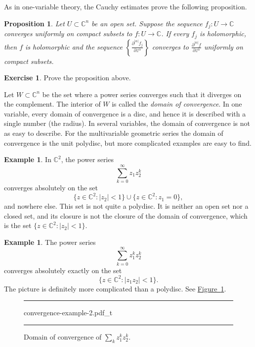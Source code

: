 \documentclass[12pt,openany]{book}
\newcommand{\sabs}[1]{\lvert {#1} \rvert}
\newcommand{\C}{{\mathbb{C}}}
\newcommand{\myindex}[1]{#1\index{#1}}
\theoremstyle{plain}
\newtheorem{prop}[thm]{Proposition}
\theoremstyle{remark}
\theoremstyle{definition}
\newenvironment{exbox}{%
    \def\FrameCommand{\vrule width 1pt \relax\hspace{10pt}}%
    \MakeFramed{\advance\hsize-\width\FrameRestore}%
}{%
    \endMakeFramed
}
\newenvironment{myfig}{%
\begin{figure}[h!t]
\noindent\rule{\textwidth}{0.5pt}\vspace{12pt}\par\centering}%
{\par\noindent\rule{\textwidth}{0.5pt}
\end{figure}}
\theoremstyle{exercise}
\newtheorem{exercise}{Exercise}[section]
\theoremstyle{example}
\newtheorem{example}[thm]{Example}
\newcommand{\figureref}[1]{\hyperref[#1]{Figure~\ref*{#1}}}
\begin{document}
As in one-variable theory, the Cauchy estimates prove the following
proposition.

\begin{prop}
Let $U \subset \C^n$ be an open set.
Suppose the sequence $f_j \colon U \to \C$ converges uniformly on compact subsets
to $f \colon U \to \C$.  If every $f_j$ is holomorphic, then $f$ is
holomorphic and 
the sequence
$\left\{ \frac{\partial^{\sabs{\alpha}} f_j}{\partial z^\alpha}\right\}$
converges to
$\frac{\partial^{\sabs{\alpha}} f}{\partial z^\alpha}$ uniformly on compact
subsets.
\end{prop}

\begin{exbox}
\begin{exercise}
Prove the proposition above.
\end{exercise}
\end{exbox}

Let $W \subset \C^n$ be the set where a power series converges
such that it diverges on the complement.  The interior of $W$
is called the
\emph{\myindex{domain of convergence}}.
In one variable, every domain of convergence is a disc, and hence it is
described with a single number (the radius).
In several variables, the domain of convergence
is not as easy to describe.
For the multivariable geometric series 
the domain of convergence is the unit polydisc, but more
complicated examples are easy to find.

\begin{example}
In $\C^2$, the power series
\begin{equation*}
\sum_{k=0}^\infty z_1 z_2^k
\end{equation*}
converges absolutely on the set
\begin{equation*}
\bigl\{ z \in \C^2 : \sabs{z_2} < 1 \bigr\}
\cup
\bigl\{ z \in \C^2 : z_1 = 0 \bigr\} ,
\end{equation*}
and nowhere else.
This set is not quite a polydisc.  It is neither an open set nor a closed set,
and its closure is not the closure of the domain of convergence,
which is the set $\bigl\{ z \in \C^2 : \sabs{z_2} < 1 \bigr\}$.
\end{example}

\begin{example}
The power series
\begin{equation*}
\sum_{k=0}^\infty z_1^k z_2^k
\end{equation*}
converges absolutely exactly on the set
\begin{equation*}
\bigl\{ z \in \C^2 : \sabs{z_1 z_2} < 1 \bigr\} .
\end{equation*}
The picture is definitely more complicated than a polydisc.
See \figureref{fig:convergence-example-2}.
\begin{myfig}
{convergence-example-2.pdf_t}
\caption{Domain of convergence of $\sum_k z_1^kz_2^k$.\label{fig:convergence-example-2}}
\end{myfig}
\end{example}
\end{document}
